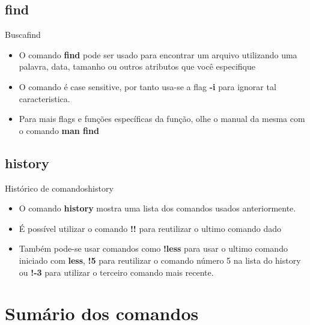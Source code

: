 \documentclass{beamer}
\begin{document}
\subsection{find}
\begin{frame}{Busca}{find}
    \begin{itemize}
    \item{O comando \textbf{find} pode ser usado para encontrar um arquivo utilizando uma palavra, data, tamanho ou outros atributos que você especifique}
    \item{O comando é case sensitive, por tanto usa-se a flag \textbf{-i} para ignorar tal caracteristica.}
    \item{Para mais flags e funções específicas da função, olhe o manual da mesma com o comando \textbf{man find}}
    \end{itemize}

\end{frame}

\subsection{history}
\begin{frame}{Histórico de comandos}{history}
  \begin{itemize}
  \item {O comando \textbf{history} mostra uma lista dos comandos usados anteriormente.
  } 
    \item{ É possível utilizar o comando \textbf{!!} para reutilizar o ultimo comando dado}
    \item{ Também pode-se usar comandos como \textbf{!less} para usar o ultimo comando iniciado com \textbf{less}, \textbf{!5} para reutilizar o comando número 5 na lista do history ou \textbf{!-3} para utilizar o terceiro comando mais recente.}
  \end{itemize}
\end{frame}

\section*{Sumário dos comandos}
\end{document}
